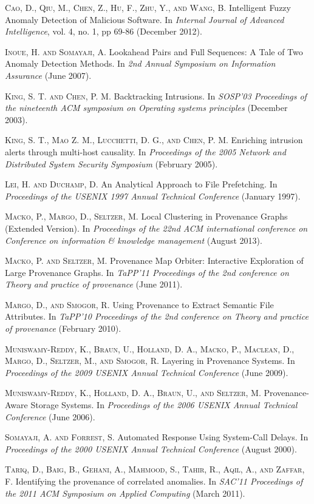\documentclass[10pt,twocolumn]{article}
\begin{document}
\begin{thebibliography}{99}

\textsc{Cao, D., Qiu, M., Chen, Z., Hu, F., Zhu, Y., and Wang, B.} Intelligent Fuzzy Anomaly Detection of Malicious Software. In {\em Internal Journal of Advanced Intelligence}, vol. 4, no. 1, pp 69-86 (December 2012).

\textsc{Inoue, H. and Somayaji, A.} Lookahead Pairs and Full Sequences: A Tale of Two Anomaly Detection Methods. In {\em 2nd Annual Symposium on Information Assurance} (June 2007). 

\textsc{King, S. T. and Chen, P. M.} Backtracking Intrusions. In {\em SOSP'03 Proceedings of the nineteenth ACM symposium on Operating systems principles} (December 2003).

\textsc{King, S. T., Mao Z. M., Lucchetti, D. G., and Chen, P. M.} Enriching intrusion alerts through multi-host causality. In {\em Proceedings of the 2005 Network and Distributed System Security Symposium} (February 2005).

\textsc{Lei, H. and Duchamp, D.} An Analytical Approach to File Prefetching. In {\em Proceedings of the USENIX 1997 Annual Technical Conference} (January 1997).

\textsc{Macko, P., Margo, D., Seltzer, M.} Local Clustering in Provenance Graphs (Extended Version). In {\em Proceedings of the 22nd ACM international conference on Conference on information \& knowledge management} (August 2013).

\textsc{Macko, P. and Seltzer, M.} Provenance Map Orbiter: Interactive Exploration of Large Provenance Graphs. In {\em TaPP'11 Proceedings of the 2nd conference on Theory and practice of provenance} (June 2011).

\textsc{Margo, D., and Smogor, R.} Using Provenance to Extract Semantic File Attributes. In {\em TaPP'10 Proceedings of the 2nd conference on Theory and practice of provenance} (February 2010).

\textsc{Muniswamy-Reddy, K., Braun, U., Holland, D. A., Macko, P., Maclean, D., Margo, D., Seltzer, M., and Smogor, R.} Layering in Provenance Systems. In {\em Proceedings of the 2009 USENIX Annual Technical Conference} (June 2009).

\textsc{Muniswamy-Reddy, K., Holland, D. A., Braun, U., and Seltzer, M.} Provenance-Aware Storage Systems. In {\em Proceedings of the 2006 USENIX Annual Technical Conference} (June 2006).

\textsc{Somayaji, A. and Forrest, S.} Automated Response Using System-Call Delays. In {\em Proceedings of the 2000 USENIX Annual Technical Conference} (August 2000).

\textsc{Tariq, D., Baig, B., Gehani, A., Mahmood, S., Tahir, R., Aqil, A., and Zaffar, F.} Identifying the provenance of correlated anomalies. In {\em SAC'11 Proceedings of the 2011 ACM Symposium on Applied Computing} (March 2011).

\end{thebibliography}
\end{document}

